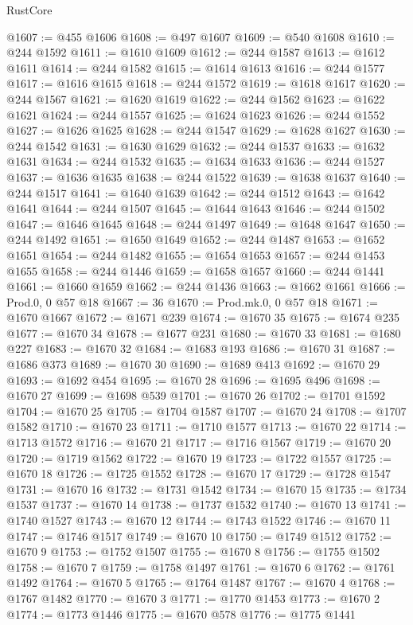 \begin{lexlean}{RustCore}
\begin{coremodule}
@1607 := @455 @1606
@1608 := @497 @1607
@1609 := @540 @1608
@1610 := @244 @1592
@1611 := @1610 @1609
@1612 := @244 @1587
@1613 := @1612 @1611
@1614 := @244 @1582
@1615 := @1614 @1613
@1616 := @244 @1577
@1617 := @1616 @1615
@1618 := @244 @1572
@1619 := @1618 @1617
@1620 := @244 @1567
@1621 := @1620 @1619
@1622 := @244 @1562
@1623 := @1622 @1621
@1624 := @244 @1557
@1625 := @1624 @1623
@1626 := @244 @1552
@1627 := @1626 @1625
@1628 := @244 @1547
@1629 := @1628 @1627
@1630 := @244 @1542
@1631 := @1630 @1629
@1632 := @244 @1537
@1633 := @1632 @1631
@1634 := @244 @1532
@1635 := @1634 @1633
@1636 := @244 @1527
@1637 := @1636 @1635
@1638 := @244 @1522
@1639 := @1638 @1637
@1640 := @244 @1517
@1641 := @1640 @1639
@1642 := @244 @1512
@1643 := @1642 @1641
@1644 := @244 @1507
@1645 := @1644 @1643
@1646 := @244 @1502
@1647 := @1646 @1645
@1648 := @244 @1497
@1649 := @1648 @1647
@1650 := @244 @1492
@1651 := @1650 @1649
@1652 := @244 @1487
@1653 := @1652 @1651
@1654 := @244 @1482
@1655 := @1654 @1653
@1657 := @244 @1453 @1655
@1658 := @244 @1446
@1659 := @1658 @1657
@1660 := @244 @1441
@1661 := @1660 @1659
@1662 := @244 @1436
@1663 := @1662 @1661
@1666 := Prod.{0, 0} @57 @18
@1667 := 36
@1670 := Prod.mk.{0, 0} @57 @18
@1671 := @1670 @1667
@1672 := @1671 @239
@1674 := @1670 35
@1675 := @1674 @235
@1677 := @1670 34
@1678 := @1677 @231
@1680 := @1670 33
@1681 := @1680 @227
@1683 := @1670 32
@1684 := @1683 @193
@1686 := @1670 31
@1687 := @1686 @373
@1689 := @1670 30
@1690 := @1689 @413
@1692 := @1670 29
@1693 := @1692 @454
@1695 := @1670 28
@1696 := @1695 @496
@1698 := @1670 27
@1699 := @1698 @539
@1701 := @1670 26
@1702 := @1701 @1592
@1704 := @1670 25
@1705 := @1704 @1587
@1707 := @1670 24
@1708 := @1707 @1582
@1710 := @1670 23
@1711 := @1710 @1577
@1713 := @1670 22
@1714 := @1713 @1572
@1716 := @1670 21
@1717 := @1716 @1567
@1719 := @1670 20
@1720 := @1719 @1562
@1722 := @1670 19
@1723 := @1722 @1557
@1725 := @1670 18
@1726 := @1725 @1552
@1728 := @1670 17
@1729 := @1728 @1547
@1731 := @1670 16
@1732 := @1731 @1542
@1734 := @1670 15
@1735 := @1734 @1537
@1737 := @1670 14
@1738 := @1737 @1532
@1740 := @1670 13
@1741 := @1740 @1527
@1743 := @1670 12
@1744 := @1743 @1522
@1746 := @1670 11
@1747 := @1746 @1517
@1749 := @1670 10
@1750 := @1749 @1512
@1752 := @1670 9
@1753 := @1752 @1507
@1755 := @1670 8
@1756 := @1755 @1502
@1758 := @1670 7
@1759 := @1758 @1497
@1761 := @1670 6
@1762 := @1761 @1492
@1764 := @1670 5
@1765 := @1764 @1487
@1767 := @1670 4
@1768 := @1767 @1482
@1770 := @1670 3
@1771 := @1770 @1453
@1773 := @1670 2
@1774 := @1773 @1446
@1775 := @1670 @578
@1776 := @1775 @1441

\end{coremodule}
\end{lexlean}
